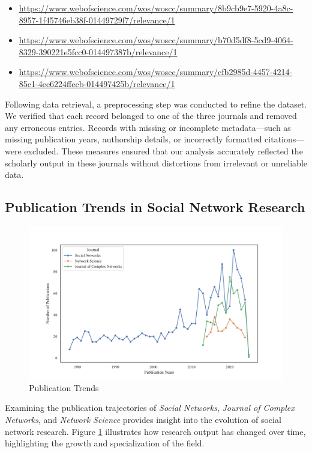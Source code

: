 \documentclass[twocolumn]{article}
\begin{document}
	\begin{itemize}
		\item \url{https://www.webofscience.com/wos/woscc/summary/8b9cb9e7-5920-4a8c-8957-1f45746eb38f-01449729f7/relevance/1}
		\item \url{https://www.webofscience.com/wos/woscc/summary/b70d5df8-5cd9-4064-8329-390221e5fcc0-014497387b/relevance/1}
		\item \url{https://www.webofscience.com/wos/woscc/summary/cfb2985d-4457-4214-85c1-4ee6224ffecb-014497425b/relevance/1}
	\end{itemize}
	
	Following data retrieval, a preprocessing step was conducted to refine the dataset. We verified that each record belonged to one of the three journals and removed any erroneous entries. Records with missing or incomplete metadata—such as missing publication years, authorship details, or incorrectly formatted citations—were excluded. These measures ensured that our analysis accurately reflected the scholarly output in these journals without distortions from irrelevant or unreliable data.
	
	\subsection{Publication Trends in Social Network Research}
	
	\begin{figure}[htbp]
		\centering
		\caption{Publication Trends}\label{fig.fig1}
		\includegraphics[width=\columnwidth]{images/Record Count Proportion.pdf}
	\end{figure}
	
	Examining the publication trajectories of \textit{Social Networks}, \textit{Journal of Complex Networks}, and \textit{Network Science} provides insight into the evolution of social network research. Figure \ref{fig.fig1} illustrates how research output has changed over time, highlighting the growth and specialization of the field.
	
\end{document}
